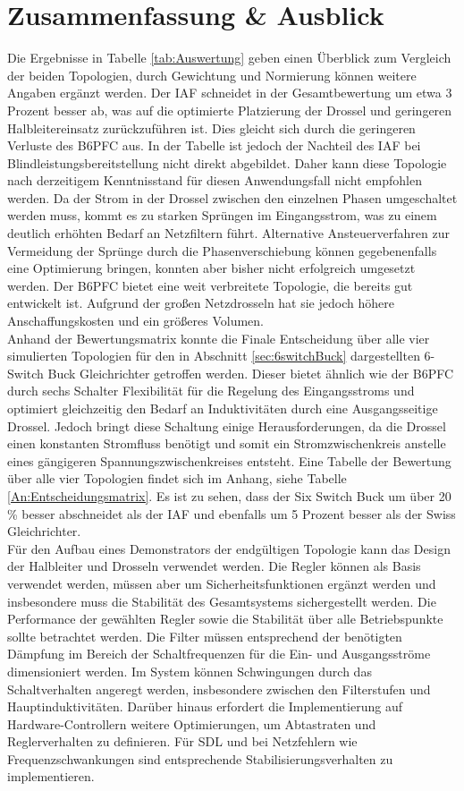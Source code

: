 \chapter{Zusammenfassung \& Ausblick}
Die Ergebnisse in Tabelle \ref{tab:Auswertung} geben einen Überblick zum Vergleich der beiden Topologien, durch Gewichtung und Normierung können weitere Angaben ergänzt werden. Der \gls{IAF} schneidet in der Gesamtbewertung um etwa 3 Prozent besser ab, was auf die optimierte Platzierung der Drossel und geringeren Halbleitereinsatz zurückzuführen ist. Dies gleicht sich durch die geringeren Verluste des \gls{B6PFC} aus. In der Tabelle ist jedoch der Nachteil des \gls{IAF} bei Blindleistungsbereitstellung nicht direkt abgebildet. Daher kann diese Topologie nach derzeitigem Kenntnisstand für diesen Anwendungsfall nicht empfohlen werden. Da der Strom in der Drossel zwischen den einzelnen Phasen umgeschaltet werden muss, kommt es zu starken Sprüngen im Eingangsstrom, was zu einem deutlich erhöhten Bedarf an Netzfiltern führt. Alternative Ansteuerverfahren zur Vermeidung der Sprünge durch die Phasenverschiebung können gegebenenfalls eine Optimierung bringen, konnten aber bisher nicht erfolgreich umgesetzt werden. Der \gls{B6PFC} bietet eine weit verbreitete Topologie, die bereits gut entwickelt ist. Aufgrund der großen Netzdrosseln hat sie jedoch höhere Anschaffungskosten und ein größeres Volumen. \\ 
Anhand der Bewertungsmatrix konnte die Finale Entscheidung über alle vier simulierten Topologien für den in Abschnitt \ref{sec:6switchBuck} dargestellten 6-Switch Buck Gleichrichter getroffen werden. Dieser bietet ähnlich wie der \gls{B6PFC} durch sechs Schalter Flexibilität für die Regelung des Eingangsstroms und optimiert gleichzeitig den Bedarf an Induktivitäten durch eine Ausgangsseitige Drossel. Jedoch bringt diese Schaltung einige Herausforderungen, da die Drossel einen konstanten Stromfluss benötigt und somit ein Stromzwischenkreis anstelle eines gängigeren Spannungszwischenkreises entsteht. Eine Tabelle der Bewertung über alle vier Topologien findet sich im Anhang, siehe Tabelle \ref{An:Entscheidungsmatrix}. Es ist zu sehen, dass der Six Switch Buck um über 20 \% besser abschneidet als der \gls{IAF} und ebenfalls um 5 Prozent besser als der Swiss Gleichrichter. \\
Für den Aufbau eines Demonstrators der endgültigen Topologie kann das Design der Halbleiter und Drosseln verwendet werden. Die Regler können als Basis verwendet werden, müssen aber um Sicherheitsfunktionen ergänzt werden und insbesondere muss die Stabilität des Gesamtsystems sichergestellt werden. Die Performance der gewählten Regler sowie die Stabilität über alle Betriebspunkte sollte betrachtet werden. Die Filter müssen entsprechend der benötigten Dämpfung im Bereich der Schaltfrequenzen für die Ein- und Ausgangsströme dimensioniert werden. Im System können Schwingungen durch das Schaltverhalten angeregt werden, insbesondere zwischen den Filterstufen und Hauptinduktivitäten. Darüber hinaus erfordert die Implementierung auf Hardware-Controllern weitere Optimierungen, um Abtastraten und Reglerverhalten zu definieren. Für \gls{SDL} und bei Netzfehlern wie Frequenzschwankungen sind entsprechende Stabilisierungsverhalten zu implementieren.\\
